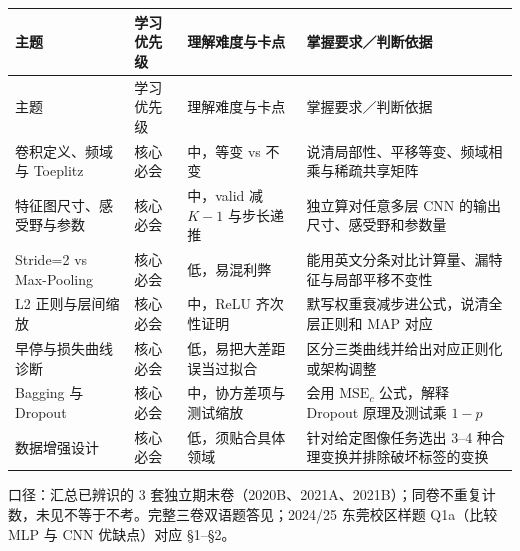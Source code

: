 \begingroup\small\setlength{\tabcolsep}{3pt}\renewcommand{\arraystretch}{1.22}
\begin{longtable}{@{}>{\raggedright\arraybackslash}p{}>{\raggedright\arraybackslash}p{}>{\raggedright\arraybackslash}p{}>{\raggedright\arraybackslash}p{}@{}}
\toprule
主题 & 学习优先级 & 理解难度与卡点 & 掌握要求／判断依据 \\
\midrule\endfirsthead
主题 & 学习优先级 & 理解难度与卡点 & 掌握要求／判断依据 \\
\midrule\endhead
\bottomrule\endfoot
卷积定义、频域与 Toeplitz & 核心必会 & 中，等变 vs 不变 & 说清局部性、平移等变、频域相乘与稀疏共享矩阵 \\
特征图尺寸、感受野与参数 & 核心必会 & 中，valid 减 $K-1$ 与步长递推 & 独立算对任意多层 CNN 的输出尺寸、感受野和参数量 \\
Stride=2 vs Max-Pooling & 核心必会 & 低，易混利弊 & 能用英文分条对比计算量、漏特征与局部平移不变性 \\
L2 正则与层间缩放 & 核心必会 & 中，ReLU 齐次性证明 & 默写权重衰减步进公式，说清全层正则和 MAP 对应 \\
早停与损失曲线诊断 & 核心必会 & 低，易把大差距误当过拟合 & 区分三类曲线并给出对应正则化或架构调整 \\
Bagging 与 Dropout & 核心必会 & 中，协方差项与测试缩放 & 会用 $\mathrm{MSE}_c$ 公式，解释 Dropout 原理及测试乘 $1-p$ \\
数据增强设计 & 核心必会 & 低，须贴合具体领域 & 针对给定图像任务选出 3–4 种合理变换并排除破坏标签的变换 \\
\end{longtable}\endgroup



口径：汇总已辨识的 3 套独立期末卷（2020B、2021A、2021B）；同卷不重复计数，未见不等于不考。完整三卷双语题答见；2024/25 东莞校区样题 Q1a（比较 MLP 与 CNN 优缺点）对应 §1–§2。

